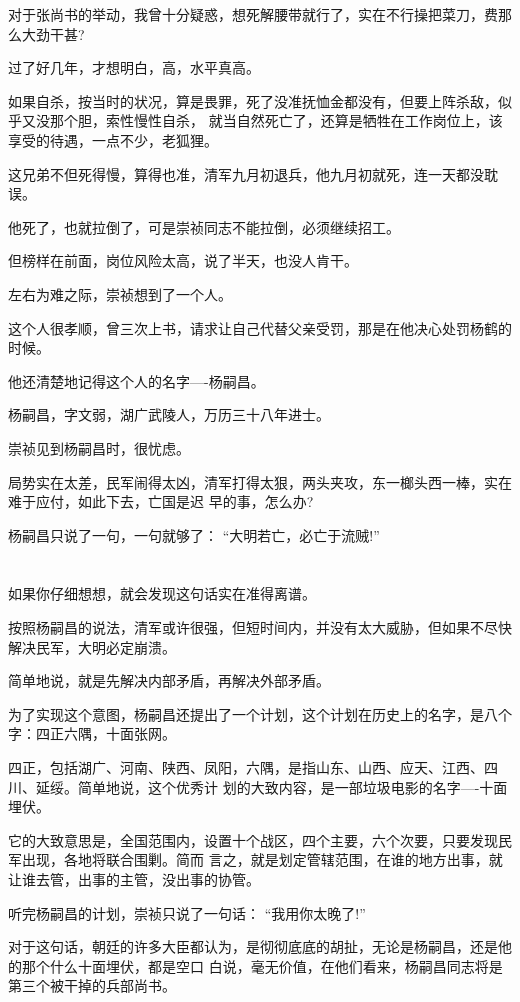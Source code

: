 \documentclass[11pt,a4paper,onecolumn]{article}
\begin{document}
对于张尚书的举动，我曾十分疑惑，想死解腰带就行了，实在不行操把菜刀，费那么大劲干甚?

过了好几年，才想明白，高，水平真高。

如果自杀，按当时的状况，算是畏罪，死了没准抚恤金都没有，但要上阵杀敌，似乎又没那个胆，索性慢性自杀，
就当自然死亡了，还算是牺牲在工作岗位上，该享受的待遇，一点不少，老狐狸。

这兄弟不但死得慢，算得也准，清军九月初退兵，他九月初就死，连一天都没耽误。

他死了，也就拉倒了，可是崇祯同志不能拉倒，必须继续招工。

但榜样在前面，岗位风险太高，说了半天，也没人肯干。

左右为难之际，崇祯想到了一个人。

这个人很孝顺，曾三次上书，请求让自己代替父亲受罚，那是在他决心处罚杨鹤的时候。

他还清楚地记得这个人的名字----杨嗣昌。

杨嗣昌，字文弱，湖广武陵人，万历三十八年进士。

崇祯见到杨嗣昌时，很忧虑。

局势实在太差，民军闹得太凶，清军打得太狠，两头夹攻，东一榔头西一棒，实在难于应付，如此下去，亡国是迟
早的事，怎么办?

杨嗣昌只说了一句，一句就够了： ``大明若亡，必亡于流贼!''

\section[\thesection]{}

如果你仔细想想，就会发现这句话实在准得离谱。

按照杨嗣昌的说法，清军或许很强，但短时间内，并没有太大威胁，但如果不尽快解决民军，大明必定崩溃。

简单地说，就是先解决内部矛盾，再解决外部矛盾。

为了实现这个意图，杨嗣昌还提出了一个计划，这个计划在历史上的名字，是八个字：四正六隅，十面张网。

四正，包括湖广、河南、陕西、凤阳，六隅，是指山东、山西、应天、江西、四川、延绥。简单地说，这个优秀计
划的大致内容，是一部垃圾电影的名字----十面埋伏。

它的大致意思是，全国范围内，设置十个战区，四个主要，六个次要，只要发现民军出现，各地将联合围剿。简而
言之，就是划定管辖范围，在谁的地方出事，就让谁去管，出事的主管，没出事的协管。

听完杨嗣昌的计划，崇祯只说了一句话： ``我用你太晚了!''

对于这句话，朝廷的许多大臣都认为，是彻彻底底的胡扯，无论是杨嗣昌，还是他的那个什么十面埋伏，都是空口
白说，毫无价值，在他们看来，杨嗣昌同志将是第三个被干掉的兵部尚书。
\end{document}
